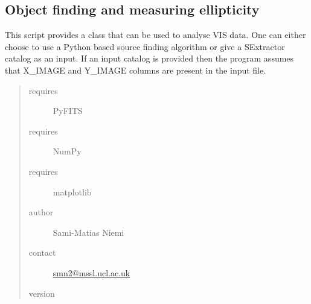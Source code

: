 \documentclass[a4paper,11pt,english]{sphinxmanual}
\begin{document}
\subsection{Object finding and measuring ellipticity}
\label{analysis:object-finding-and-measuring-ellipticity}
This script provides a class that can be used to analyse VIS data.
One can either choose to use a Python based source finding algorithm or
give a SExtractor catalog as an input. If an input catalog is provided
then the program assumes that X\_IMAGE and Y\_IMAGE columns are present
in the input file.
\begin{quote}\begin{description}
\item[{requires}] \leavevmode
PyFITS

\item[{requires}] \leavevmode
NumPy

\item[{requires}] \leavevmode
matplotlib

\item[{author}] \leavevmode
Sami-Matias Niemi

\item[{contact}] \leavevmode
\href{mailto:smn2@mssl.ucl.ac.uk}{smn2@mssl.ucl.ac.uk}

\item[{version}] 

\end{description}\end{quote}
\end{document}
